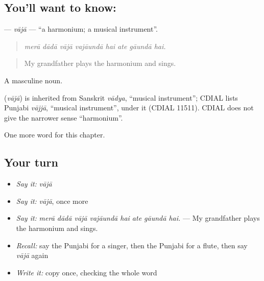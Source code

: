\subsection*{You'll want to know: }
\textbf{} — \emph{vājā} — \textquotedblleft{}a harmonium; a musical instrument\textquotedblright{}.

\begin{quote}
       
\end{quote}

\begin{quote}
\emph{merā dādā vājā vajāundā hai ate gāundā hai.}
\end{quote}

\begin{quote}
My grandfather plays the harmonium and sings.
\end{quote}

A masculine noun.

\begin{cousinweb}
\textbf{} (\emph{vājā}) is inherited from Sanskrit \emph{vādya}, \textquotedblleft{}musical instrument\textquotedblright{}; CDIAL lists Punjabi \emph{vājjā}, \textquotedblleft{}musical instrument\textquotedblright{}, under it (CDIAL 11511). CDIAL does not give the narrower sense \textquotedblleft{}harmonium\textquotedblright{}.
\end{cousinweb}

\begin{grammarlens}[title={What you've built}]
One more word for this chapter.
\end{grammarlens}

\subsection*{Your turn}
\begin{itemize}
\raggedright
  \item \emph{Say it:} \emph{vājā}
  \item \emph{Say it:} \emph{vājā}, once more
  \item \emph{Say it:} \emph{merā dādā vājā vajāundā hai ate gāundā hai.} — My grandfather plays the harmonium and sings.
  \item \emph{Recall:} say the Punjabi for a singer, then the Punjabi for a flute, then say \emph{vājā} again
  \item \emph{Write it:} copy \textbf{} once, checking the whole word
\end{itemize}

